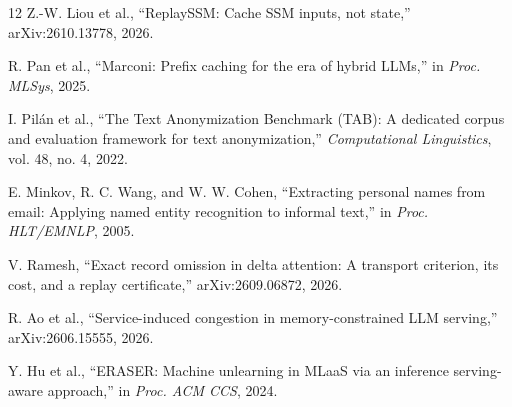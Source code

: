 \documentclass[conference]{IEEEtran}
\begin{document}
\begin{thebibliography}{12}
Z.-W. Liou et al., ``ReplaySSM: Cache SSM inputs, not state,'' arXiv:2610.13778, 2026.

R. Pan et al., ``Marconi: Prefix caching for the era of hybrid LLMs,'' in \emph{Proc. MLSys}, 2025.

I. Pil\'{a}n et al., ``The Text Anonymization Benchmark (TAB): A dedicated corpus and evaluation framework for text anonymization,'' \emph{Computational Linguistics}, vol. 48, no. 4, 2022.

E. Minkov, R. C. Wang, and W. W. Cohen, ``Extracting personal names from email: Applying named entity recognition to informal text,'' in \emph{Proc. HLT/EMNLP}, 2005.

V. Ramesh, ``Exact record omission in delta attention: A transport criterion, its cost, and a replay certificate,'' arXiv:2609.06872, 2026.

R. Ao et al., ``Service-induced congestion in memory-constrained LLM serving,'' arXiv:2606.15555, 2026.

Y. Hu et al., ``ERASER: Machine unlearning in MLaaS via an inference serving-aware approach,'' in \emph{Proc. ACM CCS}, 2024.

\end{thebibliography}
\end{document}
